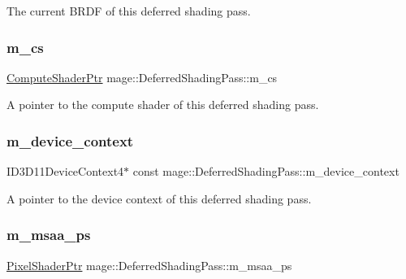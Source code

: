 The current B\+R\+DF of this deferred shading pass. \hypertarget{classmage_1_1_deferred_shading_pass_ae61ddf1399606393a2ff795a6d7e0307}{}\label{classmage_1_1_deferred_shading_pass_ae61ddf1399606393a2ff795a6d7e0307} 
\subsubsection{\texorpdfstring{m\+\_\+cs}{m\_cs}}
{\footnotesize\ttfamily \hyperlink{namespacemage_a95ee75d4d07106395d80f751d364dc1b}{Compute\+Shader\+Ptr} mage\+::\+Deferred\+Shading\+Pass\+::m\+\_\+cs\hspace{0.3cm}{\ttfamily [private]}}

A pointer to the compute shader of this deferred shading pass. \hypertarget{classmage_1_1_deferred_shading_pass_a05b1c649f39f267ce5a5cecdd02b8ffb}{}\label{classmage_1_1_deferred_shading_pass_a05b1c649f39f267ce5a5cecdd02b8ffb} 
\subsubsection{\texorpdfstring{m\+\_\+device\+\_\+context}{m\_device\_context}}
{\footnotesize\ttfamily I\+D3\+D11\+Device\+Context4$\ast$ const mage\+::\+Deferred\+Shading\+Pass\+::m\+\_\+device\+\_\+context\hspace{0.3cm}{\ttfamily [private]}}

A pointer to the device context of this deferred shading pass. \hypertarget{classmage_1_1_deferred_shading_pass_a3a9e8ace034b974bd12afa551f6b1585}{}\label{classmage_1_1_deferred_shading_pass_a3a9e8ace034b974bd12afa551f6b1585} 
\subsubsection{\texorpdfstring{m\+\_\+msaa\+\_\+ps}{m\_msaa\_ps}}
{\footnotesize\ttfamily \hyperlink{namespacemage_acbec875bb5e5e085e32ed244a24d2b6f}{Pixel\+Shader\+Ptr} mage\+::\+Deferred\+Shading\+Pass\+::m\+\_\+msaa\+\_\+ps\hspace{0.3cm}{\ttfamily [private]}}

